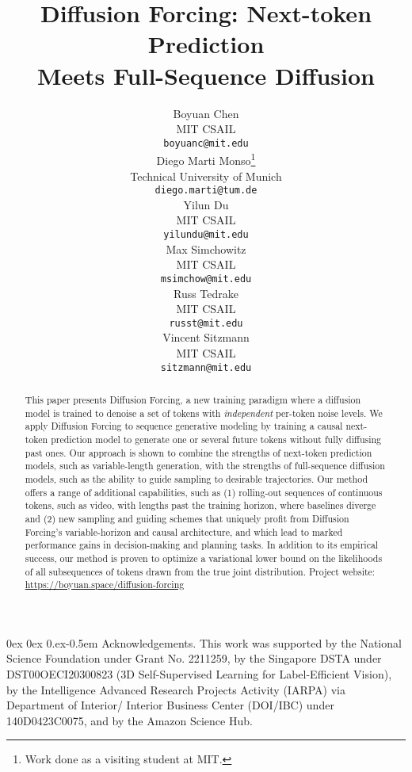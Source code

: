 \documentclass{article}
\title{Diffusion Forcing: Next-token Prediction\\Meets Full-Sequence Diffusion}
\author{%
  Boyuan Chen \\
  MIT CSAIL\\
  \texttt{boyuanc@mit.edu} \\
  \And
  Diego Marti Monso\thanks{Work done as a visiting student at MIT.} \\
  Technical University of Munich\\
  \texttt{diego.marti@tum.de} \\
  \And
  Yilun Du \\
  MIT CSAIL\\
  \texttt{yilundu@mit.edu} \\
  \And
  Max Simchowitz \\
  MIT CSAIL\\
  \texttt{msimchow@mit.edu} \\
  \And
  Russ Tedrake \\
  MIT CSAIL\\
  \texttt{russt@mit.edu} \\
  \And
  Vincent Sitzmann \\
  MIT CSAIL\\
  \texttt{sitzmann@mit.edu} \\
}
\makeatletter
\theoremstyle{plain}
\theoremstyle{definition}
\theoremstyle{remark}
\newcommand{\algons}{Diffusion Forcing}
\renewcommand{\paragraph}{%
  \@startsection{paragraph}{4}%
  {\z@}{0ex \@plus 0ex \@minus 0.ex}{-0.5em}%
  {\normalfont\normalsize\bfseries}%
}
\makeatother
\begin{document}
\maketitle
{}

\begin{abstract}
This paper presents \algons{}, a new training paradigm where a diffusion model is trained to denoise a set of tokens with \emph{independent} per-token noise levels.
We apply \algons{} to sequence generative modeling by training a causal next-token prediction model to generate one or several future tokens without fully diffusing past ones. Our approach is shown to combine the strengths of next-token prediction models, such as variable-length generation, with the strengths of full-sequence diffusion models, such as the ability to guide sampling to desirable trajectories. Our method offers a range of additional capabilities, such as (1) rolling-out sequences of continuous tokens, such as video, with lengths past the training horizon, where baselines diverge and (2) new sampling and guiding schemes that uniquely profit from \algons{}'s variable-horizon and causal architecture,  and which lead to marked performance gains in decision-making and planning tasks. In addition to its empirical success, our method is proven to optimize a variational lower bound on the likelihoods of all subsequences of tokens drawn from the true joint distribution. Project website: \url{https://boyuan.space/diffusion-forcing}

\end{abstract}










\small\paragraph{Acknowledgements.} This work was supported by the National Science Foundation under Grant No. 2211259, by the Singapore DSTA under DST00OECI20300823 (3D Self-Supervised Learning for Label-Efficient Vision), by the Intelligence Advanced Research Projects Activity (IARPA) via Department of Interior/ Interior Business Center (DOI/IBC) under 140D0423C0075, and by the Amazon Science Hub.



 



\newpage
\appendix






\end{document}
